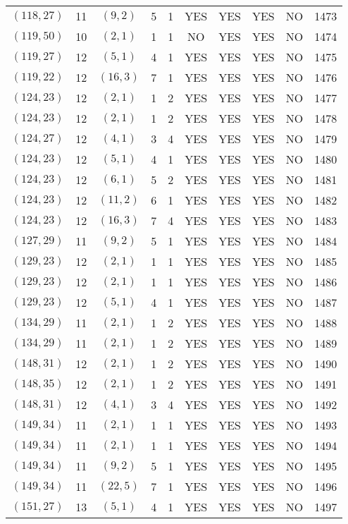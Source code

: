 \begin{longtable}{|c|c|c|c|c|c|c|c|c|c|}
$(118, 27)$ & 11 & $(9, 2)$ & 5 & 1 & YES & YES & YES & NO & 1473\\
$(119, 50)$ & 10 & $(2, 1)$ & 1 & 1 & NO & YES & YES & NO & 1474\\
$(119, 27)$ & 12 & $(5, 1)$ & 4 & 1 & YES & YES & YES & NO & 1475\\
$(119, 22)$ & 12 & $(16, 3)$ & 7 & 1 & YES & YES & YES & NO & 1476\\
$(124, 23)$ & 12 & $(2, 1)$ & 1 & 2 & YES & YES & YES & NO & 1477\\
$(124, 23)$ & 12 & $(2, 1)$ & 1 & 2 & YES & YES & YES & NO & 1478\\
$(124, 27)$ & 12 & $(4, 1)$ & 3 & 4 & YES & YES & YES & NO & 1479\\
$(124, 23)$ & 12 & $(5, 1)$ & 4 & 1 & YES & YES & YES & NO & 1480\\
$(124, 23)$ & 12 & $(6, 1)$ & 5 & 2 & YES & YES & YES & NO & 1481\\
$(124, 23)$ & 12 & $(11, 2)$ & 6 & 1 & YES & YES & YES & NO & 1482\\
$(124, 23)$ & 12 & $(16, 3)$ & 7 & 4 & YES & YES & YES & NO & 1483\\
$(127, 29)$ & 11 & $(9, 2)$ & 5 & 1 & YES & YES & YES & NO & 1484\\
$(129, 23)$ & 12 & $(2, 1)$ & 1 & 1 & YES & YES & YES & NO & 1485\\
$(129, 23)$ & 12 & $(2, 1)$ & 1 & 1 & YES & YES & YES & NO & 1486\\
$(129, 23)$ & 12 & $(5, 1)$ & 4 & 1 & YES & YES & YES & NO & 1487\\
$(134, 29)$ & 11 & $(2, 1)$ & 1 & 2 & YES & YES & YES & NO & 1488\\
$(134, 29)$ & 11 & $(2, 1)$ & 1 & 2 & YES & YES & YES & NO & 1489\\
$(148, 31)$ & 12 & $(2, 1)$ & 1 & 2 & YES & YES & YES & NO & 1490\\
$(148, 35)$ & 12 & $(2, 1)$ & 1 & 2 & YES & YES & YES & NO & 1491\\
$(148, 31)$ & 12 & $(4, 1)$ & 3 & 4 & YES & YES & YES & NO & 1492\\
$(149, 34)$ & 11 & $(2, 1)$ & 1 & 1 & YES & YES & YES & NO & 1493\\
$(149, 34)$ & 11 & $(2, 1)$ & 1 & 1 & YES & YES & YES & NO & 1494\\
$(149, 34)$ & 11 & $(9, 2)$ & 5 & 1 & YES & YES & YES & NO & 1495\\
$(149, 34)$ & 11 & $(22, 5)$ & 7 & 1 & YES & YES & YES & NO & 1496\\
$(151, 27)$ & 13 & $(5, 1)$ & 4 & 1 & YES & YES & YES & NO & 1497\\

\end{longtable}

